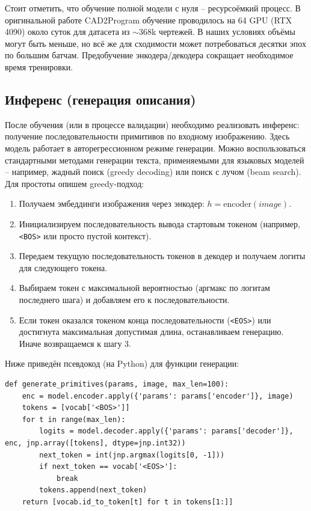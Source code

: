 \documentclass{article}
\begin{document}
Стоит отметить, что обучение полной модели с нуля – ресурсоёмкий процесс. В оригинальной работе CAD2Program обучение проводилось на 64 GPU (RTX 4090) около суток для датасета из $\sim$368k чертежей. В наших условиях объёмы могут быть меньше, но всё же для сходимости может потребоваться десятки эпох по большим батчам. Предобучение энкодера/декодера сокращает необходимое время тренировки.

\subsection{Инференс (генерация описания)}

После обучения (или в процессе валидации) необходимо реализовать инференс: получение последовательности примитивов по входному изображению. Здесь модель работает в авторегрессионном режиме генерации. Можно воспользоваться стандартными методами генерации текста, применяемыми для языковых моделей – например, жадный поиск (greedy decoding) или поиск с лучом (beam search). Для простоты опишем greedy-подход:
\begin{enumerate}
\item Получаем эмбеддинги изображения через энкодер: $h = \text{encoder}(image)$.
\item Инициализируем последовательность вывода стартовым токеном (например, \texttt{<BOS>} или просто пустой контекст).
\item Передаем текущую последовательность токенов в декодер и получаем логиты для следующего токена.
\item Выбираем токен с максимальной вероятностью (аргмакс по логитам последнего шага) и добавляем его к последовательности.
\item Если токен оказался токеном конца последовательности (\texttt{<EOS>}) или достигнута максимальная допустимая длина, останавливаем генерацию. Иначе возвращаемся к шагу 3.
\end{enumerate}

Ниже приведён псевдокод (на Python) для функции генерации:

\begin{lstlisting}
def generate_primitives(params, image, max_len=100):
    enc = model.encoder.apply({'params': params['encoder']}, image)
    tokens = [vocab['<BOS>']]
    for t in range(max_len):
        logits = model.decoder.apply({'params': params['decoder']}, enc, jnp.array([tokens], dtype=jnp.int32))
        next_token = int(jnp.argmax(logits[0, -1]))
        if next_token == vocab['<EOS>']:
            break
        tokens.append(next_token)
    return [vocab.id_to_token[t] for t in tokens[1:]]
\end{lstlisting}
\end{document}
